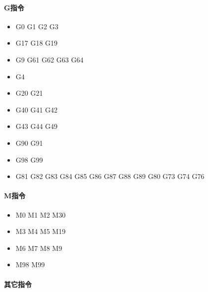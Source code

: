 \paragraph{G指令}\begin{itemize}
	\item G0 G1 G2 G3

	\item G17 G18 G19

	\item G9 G61 G62 G63 G64

	\item G4 

	\item G20 G21

	\item G40 G41 G42 

	\item G43 G44 G49 

	\item G90 G91

	\item G98 G99

	\item G81 G82 G83 G84 G85 G86 G87 G88 G89 G80 G73 G74 G76

\end{itemize}

\paragraph{M指令}

\begin{itemize}
	\item M0 M1 M2 M30

	\item M3 M4 M5 M19 

	\item M6 M7 M8 M9

	\item M98 M99

\end{itemize}

\paragraph{其它指令}
